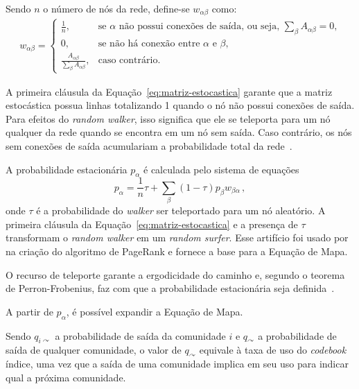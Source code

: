 \documentclass[
  article,
  11pt,
  a4paper,
  english,
  brazil,
  sumario=tradicional]{abntex2}
\begin{document}
Sendo $n$ o número de nós da rede, define-se $w_{\alpha \beta}$ como:
\begin{align} \label{eq:matriz-estocastica}
w_{\alpha \beta} = 
    \begin{cases*}
        \frac{1}{n}, & \text{se $\alpha$ não possui conexões de saída, ou seja, $\sum_\beta A_{\alpha \beta} = 0$,} \\
        0, & \text{se não há conexão entre $\alpha$ e $\beta$,} \\
        \frac{A_{\alpha \beta}}{\sum_\beta A_{\alpha \beta}}, & \text{caso contrário.}
    \end{cases*}
\end{align}

A primeira cláusula da Equação~\ref{eq:matriz-estocastica} garante que a matriz estocástica possua linhas totalizando 1 quando o nó não possui conexões de saída. Para efeitos do \textit{random walker}, isso significa que ele se teleporta para um nó qualquer da rede quando se encontra em um nó sem saída. Caso contrário, os nós sem conexões de saída acumulariam a probabilidade total da rede~\cite{Page1999-ag}.

A probabilidade estacionária $p_\alpha$ é calculada pelo sistema de equações
\begin{equation} \label{eq:page-rank}
p_\alpha = \frac{1}{n} \tau + \sum_\beta (1 - \tau) p_\beta w_{\beta \alpha}\,,
\end{equation}
onde $\tau$ é a probabilidade do \textit{walker} ser teleportado para um nó aleatório. A primeira cláusula da Equação~\ref{eq:matriz-estocastica} e a presença de $\tau$ transformam o \textit{random walker} em um \textit{random surfer}. Esse artifício foi usado por~ na criação do algoritmo de PageRank e fornece a base para a Equação de Mapa.

O recurso de teleporte garante a ergodicidade do caminho e, segundo o teorema de Perron-Frobenius, faz com que a probabilidade estacionária seja definida~\cite{Rosvall2009-sd}.

A partir de $p_\alpha$, é possível expandir a Equação de Mapa.

Sendo $q_{i \curvearrowright}$ a probabilidade de saída da comunidade $i$ e $q_{\curvearrowright}$ a probabilidade de saída de qualquer comunidade, o valor de $q_{\curvearrowright}$ equivale à taxa de uso do \textit{codebook} índice, uma vez que a saída de uma comunidade implica  em seu uso para indicar qual a próxima comunidade.
\end{document}
